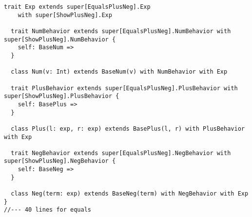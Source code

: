 \begin{lstlisting}[basicstyle=\tiny]
  trait Exp extends super[EqualsPlusNeg].Exp
    with super[ShowPlusNeg].Exp

  trait NumBehavior extends super[EqualsPlusNeg].NumBehavior with super[ShowPlusNeg].NumBehavior {
    self: BaseNum =>
  }

  class Num(v: Int) extends BaseNum(v) with NumBehavior with Exp

  trait PlusBehavior extends super[EqualsPlusNeg].PlusBehavior with super[ShowPlusNeg].PlusBehavior {
    self: BasePlus =>
  }

  class Plus(l: exp, r: exp) extends BasePlus(l, r) with PlusBehavior with Exp

  trait NegBehavior extends super[EqualsPlusNeg].NegBehavior with super[ShowPlusNeg].NegBehavior {
    self: BaseNeg =>
  }

  class Neg(term: exp) extends BaseNeg(term) with NegBehavior with Exp
}
//--- 40 lines for equals
\end{lstlisting}


